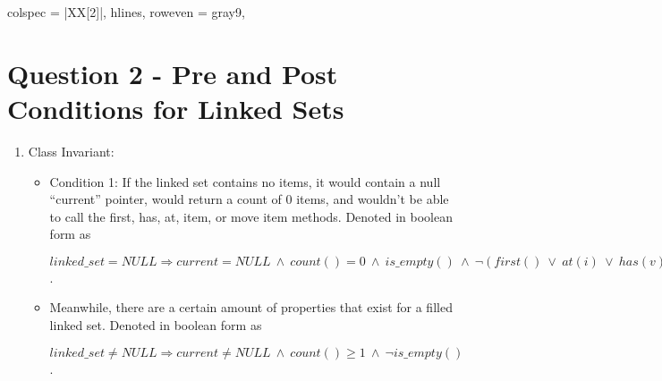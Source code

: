 \documentclass{article}
\newcommand{\LAnd}{\ \wedge\ }
\newcommand{\LOr}{\ \vee\ }
\begin{document}
\begin{longtblr}[
    caption = {Question 1 Table},
    label = {tab:q1},
  ]{
    colspec = {|XX[2]|},
    hlines,
    row{even} = {gray9},
  }
\end{longtblr}

\newpage

\section*{Question 2 - Pre and Post Conditions for Linked Sets}

\begin{enumerate}
    \item Class Invariant:
    \begin{itemize}
        \item Condition 1: If the linked set contains no items, it would contain a null ``current'' pointer, would return a count of 0 items, and wouldn't be able to call the first, has, at, item, or move item methods. Denoted in boolean form as

        $linked\_set = NULL \Rightarrow current = NULL \LAnd count() = 0 \LAnd is\_empty() \LAnd \lnot (first() \LOr at(i) \LOr has(v) \LOr item() \LOr move\_item(v))$.
        \item Meanwhile, there are a certain amount of properties that exist for a filled linked set. Denoted in boolean form as

        $linked\_set \neq NULL \Rightarrow current \neq NULL \LAnd count() \geq 1 \LAnd \lnot is\_empty()$.


\end{itemize}
\end{enumerate}
\end{document}
